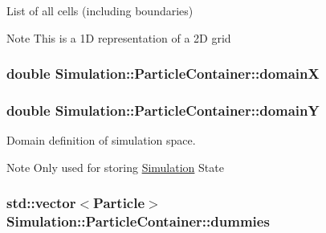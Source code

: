 List of all cells (including boundaries) 

\begin{DoxyNote}{Note}
This is a 1\-D representation of a 2\-D grid 
\end{DoxyNote}
\hypertarget{classSimulation_1_1ParticleContainer_a62984b65f30802a718edb5a1d7a20974}{
\subsubsection[{domain\-X}]{\setlength{\rightskip}{0pt plus 5cm}double Simulation\-::\-Particle\-Container\-::domain\-X\hspace{0.3cm}{\ttfamily [private]}}}\label{classSimulation_1_1ParticleContainer_a62984b65f30802a718edb5a1d7a20974}
\hypertarget{classSimulation_1_1ParticleContainer_a6398508c88afa2b1f50516457d20d747}{
\subsubsection[{domain\-Y}]{\setlength{\rightskip}{0pt plus 5cm}double Simulation\-::\-Particle\-Container\-::domain\-Y\hspace{0.3cm}{\ttfamily [private]}}}\label{classSimulation_1_1ParticleContainer_a6398508c88afa2b1f50516457d20d747}


Domain definition of simulation space. 

\begin{DoxyNote}{Note}
Only used for storing \hyperlink{namespaceSimulation}{Simulation} State 
\end{DoxyNote}
\hypertarget{classSimulation_1_1ParticleContainer_af7710cc9a30897b05c4dae5610562f2e}{
\subsubsection[{dummies}]{\setlength{\rightskip}{0pt plus 5cm}std\-::vector$<${\bf Particle}$>$ Simulation\-::\-Particle\-Container\-::dummies\hspace{0.3cm}{\ttfamily [private]}}}\label{classSimulation_1_1ParticleContainer_af7710cc9a30897b05c4dae5610562f2e}


